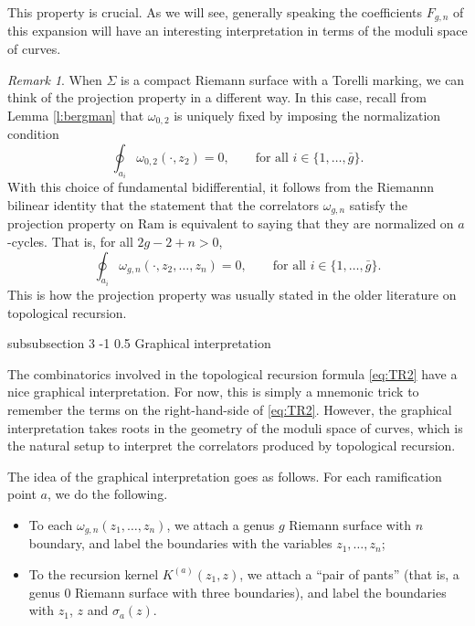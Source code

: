\documentclass[reqno,oneside,11pt]{amsart}
\makeatletter
\theoremstyle{plain}
\theoremstyle{definition}
\theoremstyle{remark}
\newtheorem{remark}[theorem]{Remark}
\numberwithin{equation}{section}
\renewcommand{\subsubsection}{\@startsection
{subsubsection}%
{3}%
{\z@}%
{-1\baselineskip}%
{0.5\baselineskip}%
{\normalfont \it \normalsize}} %
\newcommand{\Ra}{\text{Ram}}
\makeatother
\begin{document}
This property is crucial. As we will see, generally speaking the coefficients $F_{g,n} $ of this expansion will have an interesting interpretation in terms of the moduli space of curves.


\begin{remark}\label{r:acycles}
When $\Sigma$ is a compact Riemann surface with a Torelli marking, we can think of the projection property in a different way. In this case, recall from Lemma \ref{l:bergman} that $\omega_{0,2}$ is uniquely fixed by imposing the normalization condition
\begin{equation}
\oint_{a_i} \omega_{0,2}(\cdot, z_2) = 0, \qquad \text{for all $i \in \{1,\ldots,\bar{g} \}$.}
\end{equation}
With this choice of fundamental bidifferential, it follows from the Riemannn bilinear identity that the statement that the correlators $\omega_{g,n}$ satisfy the projection property on $\Ra$ is equivalent to saying that they are normalized on $a$-cycles. That is, for all $2g-2+n>0$,
\begin{equation}
\oint_{a_i} \omega_{g,n}(\cdot, z_2, \ldots, z_n) = 0, \qquad \text{for all $i \in \{1,\ldots,\bar{g} \}$.}
\end{equation}
This is how the projection property was usually stated in the older literature on topological recursion.
\end{remark}

\subsubsection{Graphical interpretation}

The combinatorics involved in the topological recursion formula \eqref{eq:TR2} have a nice graphical interpretation. For now, this is simply a mnemonic trick to remember the terms on the right-hand-side of \eqref{eq:TR2}. However, the graphical interpretation takes roots in the geometry of the moduli space of curves, which is the natural setup to interpret the correlators produced by topological recursion. 

The idea of the graphical interpretation goes as follows. For each ramification point $a$, we do the following.
\begin{itemize}
\item To each $\omega_{g,n}(z_1,\ldots,z_n)$, we attach a genus $g$ Riemann surface with $n$ boundary, and label the boundaries with the variables $z_1,\ldots,z_n$;
\item To the recursion kernel $K^{(a)}(z_1,z)$, we attach a ``pair of pants'' (that is, a genus $0$ Riemann surface with three boundaries), and label the boundaries with $z_1$, $z$ and $\sigma_a(z)$. 
\end{itemize}
\end{document}
